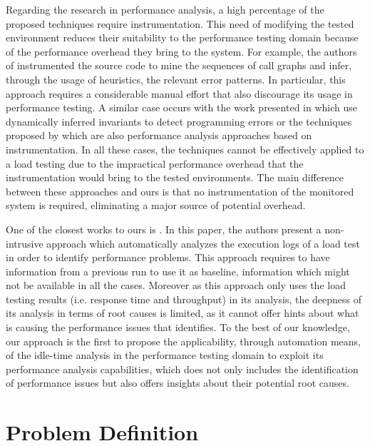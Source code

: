 \documentclass[runningheads,a4paper]{llncs}
\begin{document}
Regarding the research in performance analysis, a high percentage of
the proposed techniques require instrumentation. This need of modifying the
tested environment reduces their suitability to the performance testing domain
because of the performance overhead they bring to the system. For example, the
authors of \cite{Yang1} instrumented the source code to mine the sequences of
call graphs and infer, through the usage of heuristics, the relevant error
patterns. In particular, this approach requires a considerable manual effort
that also discourage its usage in performance testing. A similar case occurs
with the work presented in \cite{Hangal1,Csallner1} which use dynamically
inferred invariants to detect programming errors or the techniques proposed by
\cite{Barham1,Chen2} which are also performance analysis approaches based on instrumentation. 
In all these cases, the techniques cannot be effectively applied to a
load testing due to the impractical performance overhead that the
instrumentation would bring to the tested environments. The main difference between 
these approaches and ours is that no instrumentation of the monitored system is 
required, eliminating a major source of potential overhead.

One of the closest works to ours is \cite{Jiang2009}. In this paper, the authors
present a non-intrusive approach which automatically analyzes the execution logs
of a load test in order to identify performance problems. This approach requires to have
information from a previous run to use it as baseline, information which might
not be available in all the cases. Moreover as this approach only uses 
the load testing results (i.e. response time and throughput) in its analysis,
the deepness of its analysis in terms of root causes is limited, as it cannot offer 
hints about what is causing the performance issues that identifies. To the best of 
our knowledge, our approach is the first to propose the applicability, through
automation means, of the idle-time analysis in the performance testing domain to exploit 
its performance analysis capabilities, which does not only includes the
identification of performance issues but also offers insights about their
potential root causes.


\section{Problem Definition}
\end{document}
